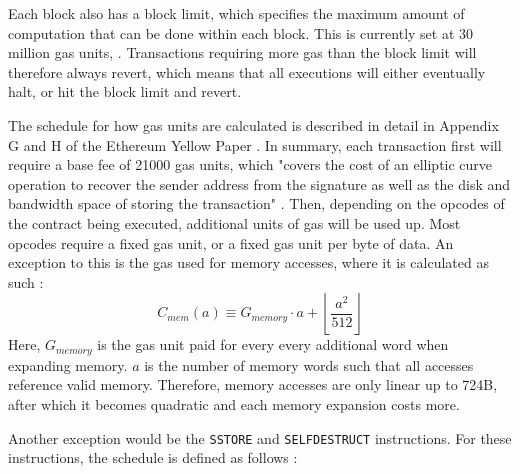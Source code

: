 Each block also has a block limit, which specifies the maximum amount of computation
that can be done within each block. This is currently set at 30 million gas units,
\cite{ethgas}. Transactions requiring more 
gas than the block limit will therefore always revert, which means that all executions
will either eventually halt, or hit the block limit and revert.


The schedule for how gas units are calculated is described in detail in Appendix G and H of
the Ethereum Yellow Paper \cite{ethereumyellowpaper}. In summary, each transaction first will require
a base fee of 21000 gas units, which "covers the cost of an elliptic curve operation to recover the 
sender address from the signature as well as the disk and bandwidth space of storing the transaction" 
\cite{ethdesignrationale}. Then, depending on the opcodes of the contract being executed, additional
units of gas will be used up. Most opcodes require a fixed gas unit, or a fixed gas unit per byte of data.
An exception to this is the gas used for memory accesses, where it is calculated as such \cite{ethereumyellowpaper}:
\[ C_{mem}(a) \equiv G_{memory} \cdot a + \left \lfloor{\frac{a^2}{512}}\right \rfloor \]
Here, $G_{memory}$ is the gas unit paid for every every additional word when expanding memory.
$a$ is the number of memory words such that all accesses reference valid memory. Therefore,
memory accesses are only linear up to 724B, after which it becomes quadratic and each memory
expansion costs more.

Another exception would be the \texttt{SSTORE} and \texttt{SELFDESTRUCT} instructions. For
these instructions, the schedule is defined as follows \cite{ethereumyellowpaper}:

